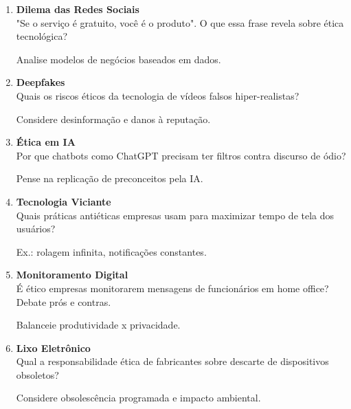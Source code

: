 \documentclass[11pt]{article}
\begin{document}
\begin{multicols}{2}
\begin{enumerate}
\item \textbf{Dilema das Redes Sociais}\\
"Se o serviço é gratuito, você é o produto". O que essa frase revela sobre ética tecnológica?
\begin{tcolorbox}[colback=explanationbg,colframe=titleblue,title=Dica:]
Analise modelos de negócios baseados em dados.
\end{tcolorbox}

\item \textbf{Deepfakes}\\
Quais os riscos éticos da tecnologia de vídeos falsos hiper-realistas?
\begin{tcolorbox}[colback=explanationbg,colframe=titleblue,title=Dica:]
Considere desinformação e danos à reputação.
\end{tcolorbox}

\item \textbf{Ética em IA}\\
Por que chatbots como ChatGPT precisam ter filtros contra discurso de ódio?
\begin{tcolorbox}[colback=explanationbg,colframe=titleblue,title=Dica:]
Pense na replicação de preconceitos pela IA.
\end{tcolorbox}

\item \textbf{Tecnologia Viciante}\\
Quais práticas antiéticas empresas usam para maximizar tempo de tela dos usuários?
\begin{tcolorbox}[colback=explanationbg,colframe=titleblue,title=Dica:]
Ex.: rolagem infinita, notificações constantes.
\end{tcolorbox}

\item \textbf{Monitoramento Digital}\\
É ético empresas monitorarem mensagens de funcionários em home office? Debate prós e contras.
\begin{tcolorbox}[colback=explanationbg,colframe=titleblue,title=Dica:]
Balanceie produtividade x privacidade.
\end{tcolorbox}

\item \textbf{Lixo Eletrônico}\\
Qual a responsabilidade ética de fabricantes sobre descarte de dispositivos obsoletos?
\begin{tcolorbox}[colback=explanationbg,colframe=titleblue,title=Dica:]
Considere obsolescência programada e impacto ambiental.
\end{tcolorbox}

\end{enumerate}
\end{multicols}
\end{document}
